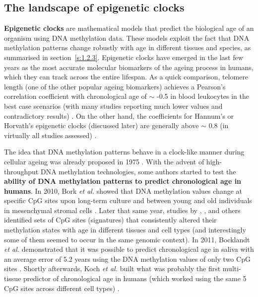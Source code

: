 \smallskip

\subsection{The landscape of epigenetic clocks}

\smallskip

\textbf{Epigenetic clocks} are mathematical models that predict the biological age of an organism using DNA methylation data. These models exploit the fact that DNA methylation patterns change robustly with age in different tissues and species, as summarised in section~\ref{s:1.2.3}. Epigenetic clocks have emerged in the last few years as the most accurate molecular biomarkers of the ageing process in humans, which they can track across the entire lifespan. As a quick comparison, telomere length (one of the other popular ageing biomarkers) achieves a Pearson's correlation coefficient with chronological age of $\sim$ -0.5 in blood leukocytes in the best case scenarios (with many studies reporting much lower values and contradictory results) \citep{Newman2013}. On the other hand, the coefficients for Hannum's or Horvath's epigenetic clocks (discussed later) are generally above $\sim$ 0.8 (in virtually all studies assessed) \citep{Chen2016}.

\bigskip

The idea that DNA methylation patterns behave in a clock-like manner during cellular ageing was already proposed in 1975 \citep{Holliday1975}. With the advent of high-throughput DNA methylation technologies, some authors started to test the \textbf{ability of DNA methylation patterns to predict chronological age in humans}. In 2010, Bork \textit{et al.} showed that DNA methylation values change at specific CpG sites upon long-term culture and between young and old individuals in mesenchymal stromal cells \citep{Bork2010}. Later that same year, studies by \citet{Teschendorff2010}, \citet{Rakyan2010}, \citet{Gronniger2010} and others identified sets of CpG sites (signatures) that consistently altered their methylation states with age in different tissues and cell types (and interestingly some of them seemed to occur in the same genomic context). In 2011, Bocklandt \textit{et al.} demonstrated that it was possible to predict chronological age in saliva with an average error of 5.2 years using the DNA methylation values of only two CpG sites \citep{Bocklandt2011}. Shortly afterwards, Koch \textit{et al.} built what was probably the first multi-tissue predictor of chronological age in humans (which worked using the same 5 CpG sites across different cell types) \citep{Koch2011}. 


